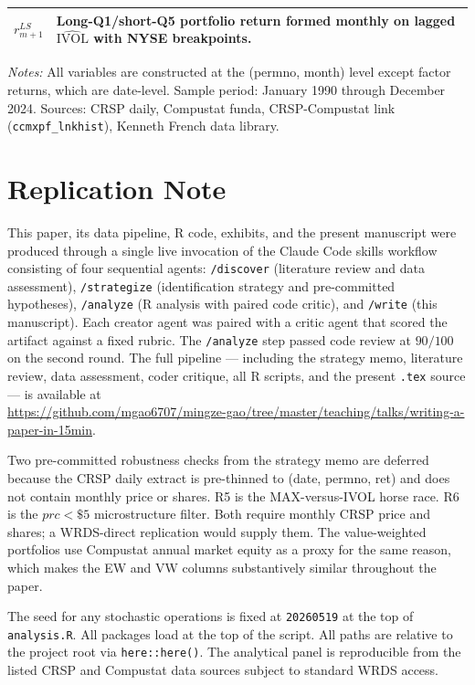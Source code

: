 \documentclass[12pt]{article}
\newcommand{\1}[1]{\mathds{1}\left[#1\right]}
\begin{document}
\begin{appendices}
\begin{table}[H]
\begin{threeparttable}
\begin{tabular}{p{}p{}}
$r^{LS}_{m+1}$ & Long-Q1/short-Q5 portfolio return formed monthly on lagged $\widehat{\mathrm{IVOL}}$ with NYSE breakpoints. \\
\bottomrule
\end{tabular}
\begin{tablenotes}\small
\item \textit{Notes:} All variables are constructed at the (permno, month)
level except factor returns, which are date-level. Sample period:
January 1990 through December 2024. Sources: CRSP daily, Compustat funda,
CRSP-Compustat link (\texttt{ccmxpf\_lnkhist}), Kenneth French data library.
\end{tablenotes}
\end{threeparttable}
\end{table}

\section{Replication Note}\label{app:replication}

This paper, its data pipeline, R code, exhibits, and the present manuscript
were produced through a single live invocation of the Claude Code skills
workflow consisting of four sequential agents: \texttt{/discover} (literature
review and data assessment), \texttt{/strategize} (identification strategy
and pre-committed hypotheses), \texttt{/analyze} (R analysis with paired code
critic), and \texttt{/write} (this manuscript). Each creator agent was paired
with a critic agent that scored the artifact against a fixed rubric. The
\texttt{/analyze} step passed code review at $90/100$ on the second round.
The full pipeline --- including the strategy memo, literature review, data
assessment, coder critique, all R scripts, and the present \texttt{.tex}
source --- is available at\\
\url{https://github.com/mgao6707/mingze-gao/tree/master/teaching/talks/writing-a-paper-in-15min}.

Two pre-committed robustness checks from the strategy memo are deferred
because the CRSP daily extract is pre-thinned to (date, permno, ret) and
does not contain monthly price or shares. R5 is the
\citet{bali2011maxing} MAX-versus-IVOL horse race. R6 is the
\citet{han2011investor} $prc<\$5$ microstructure filter. Both require
monthly CRSP price and shares; a WRDS-direct replication would supply them.
The value-weighted portfolios use Compustat annual market equity as a
proxy for the same reason, which makes the EW and VW columns substantively
similar throughout the paper.

The seed for any stochastic operations is fixed at \texttt{20260519} at the
top of \texttt{analysis.R}. All packages load at the top of the script.
All paths are relative to the project root via \texttt{here::here()}. The
analytical panel is reproducible from the listed CRSP and Compustat data
sources subject to standard WRDS access.

\end{appendices}

\clearpage
\small \printbibliography
\end{document}
